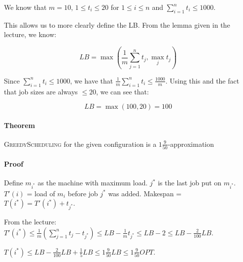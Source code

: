 We know that $m = 10$, $1 \leq t_i \leq 20$ for $1 \leq i \leq n$ and $\sum_{i=1}^n{t_i} \leq 1000$.

This allows us to more clearly define the LB.
From the lemma given in the lecture, we know:

\[
	LB = \max{\left(\frac{1}{m} \sum_{j=1}^n{t_j}, \max_j{t_j} \right)}
\]

Since $\sum_{i=1}^n{t_i} \leq 1000$, we have that $\frac{1}{m}\sum_{i=1}^n{t_i} \leq \frac{1000}{m}$.
Using this and the fact that job sizes are always $\leq 20$, we can see that:

\[
	LB = \max{\left(100, 20\right)} = 100
\]

\paragraph{Theorem} \textsc{GreedyScheduling} for the given configuration is a $1 \frac{9}{50}$-approximation

\paragraph{Proof} Define $m_{i^*}$ as the machine with maximum load. $j^*$ is the last job put on $m_{i^*}$.
$T'(i)$ = load of $m_i$ before job $j^*$ was added.
Makespan = $T(i^*) = T'(i^*) + t_{j^*}$.

From the lecture:
$T'(i^*) \leq \frac{1}{m} \left( \sum_{j=1}^n{t_j} - t_{j^*} \right) \leq LB - \frac{1}{m} t_{j^*} \leq LB - 2 \leq LB - \frac{2}{100} LB$.

$T(i^*) \leq LB - \frac{2}{100} LB + \frac{1}{5} LB \leq 1 \frac{9}{50} LB \leq 1 \frac{9}{50} OPT$.
